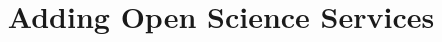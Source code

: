 \documentclass{article}
\begin{document}
\title{Adding Open Science Services}

\maketitle
\end{document}
